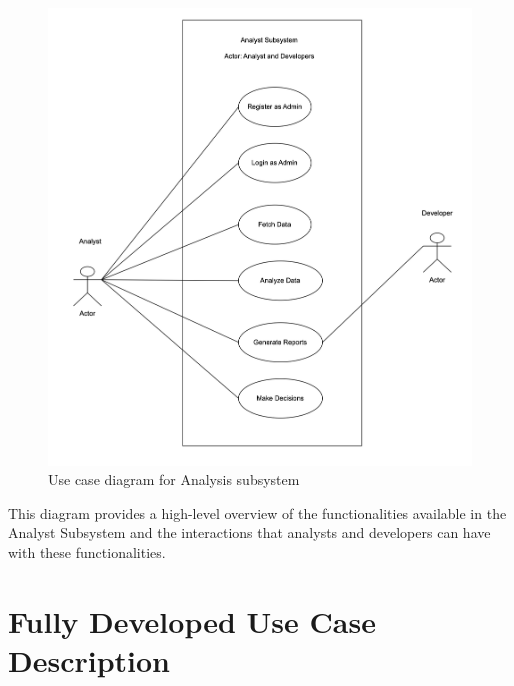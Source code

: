 \begin{figure}[h!t]
    \centering
    \includegraphics[width=\textwidth]{images/ucAnaysis.png}
    \caption{Use case diagram for Analysis subsystem}
    \label{fig:ucAnaysis}
\end{figure}

\FloatBarrier

This diagram provides a high-level overview of the functionalities available in the Analyst Subsystem and the interactions that analysts and developers can have with these functionalities. 

\section{Fully Developed Use Case Description}

